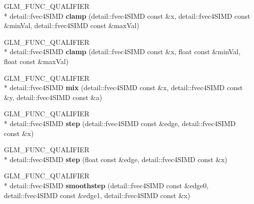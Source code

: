 \begin{DoxyCompactItemize}
\item 
\hypertarget{namespaceglm_a5c4a12e002e5eb23b8a12639c7484378}{G\-L\-M\-\_\-\-F\-U\-N\-C\-\_\-\-Q\-U\-A\-L\-I\-F\-I\-E\-R \\*
detail\-::fvec4\-S\-I\-M\-D {\bfseries clamp} (detail\-::fvec4\-S\-I\-M\-D const \&x, detail\-::fvec4\-S\-I\-M\-D const \&min\-Val, detail\-::fvec4\-S\-I\-M\-D const \&max\-Val)}\label{namespaceglm_a5c4a12e002e5eb23b8a12639c7484378}

\item 
\hypertarget{namespaceglm_ae7db62bebbc1cdea7444d6f89313af2f}{G\-L\-M\-\_\-\-F\-U\-N\-C\-\_\-\-Q\-U\-A\-L\-I\-F\-I\-E\-R \\*
detail\-::fvec4\-S\-I\-M\-D {\bfseries clamp} (detail\-::fvec4\-S\-I\-M\-D const \&x, float const \&min\-Val, float const \&max\-Val)}\label{namespaceglm_ae7db62bebbc1cdea7444d6f89313af2f}

\item 
\hypertarget{namespaceglm_a4b388e53d27196411517929d6ee91867}{G\-L\-M\-\_\-\-F\-U\-N\-C\-\_\-\-Q\-U\-A\-L\-I\-F\-I\-E\-R \\*
detail\-::fvec4\-S\-I\-M\-D {\bfseries mix} (detail\-::fvec4\-S\-I\-M\-D const \&x, detail\-::fvec4\-S\-I\-M\-D const \&y, detail\-::fvec4\-S\-I\-M\-D const \&a)}\label{namespaceglm_a4b388e53d27196411517929d6ee91867}

\item 
\hypertarget{namespaceglm_a0af681288eaacb38ded2a597bc7fd214}{G\-L\-M\-\_\-\-F\-U\-N\-C\-\_\-\-Q\-U\-A\-L\-I\-F\-I\-E\-R \\*
detail\-::fvec4\-S\-I\-M\-D {\bfseries step} (detail\-::fvec4\-S\-I\-M\-D const \&edge, detail\-::fvec4\-S\-I\-M\-D const \&x)}\label{namespaceglm_a0af681288eaacb38ded2a597bc7fd214}

\item 
\hypertarget{namespaceglm_ac7e3b091e30c01352c8349c656d52a9f}{G\-L\-M\-\_\-\-F\-U\-N\-C\-\_\-\-Q\-U\-A\-L\-I\-F\-I\-E\-R \\*
detail\-::fvec4\-S\-I\-M\-D {\bfseries step} (float const \&edge, detail\-::fvec4\-S\-I\-M\-D const \&x)}\label{namespaceglm_ac7e3b091e30c01352c8349c656d52a9f}

\item 
\hypertarget{namespaceglm_acaa3fe01372937d4ee7739ad87db0f15}{G\-L\-M\-\_\-\-F\-U\-N\-C\-\_\-\-Q\-U\-A\-L\-I\-F\-I\-E\-R \\*
detail\-::fvec4\-S\-I\-M\-D {\bfseries smoothstep} (detail\-::fvec4\-S\-I\-M\-D const \&edge0, detail\-::fvec4\-S\-I\-M\-D const \&edge1, detail\-::fvec4\-S\-I\-M\-D const \&x)}\label{namespaceglm_acaa3fe01372937d4ee7739ad87db0f15}


\end{DoxyCompactItemize}
